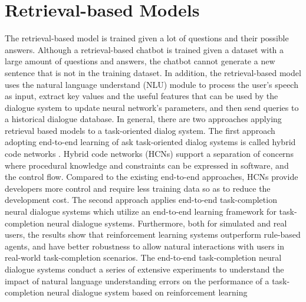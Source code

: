 \section{Retrieval-based Models}\label{subsubsec:Retrieval-based Models}
The retrieval-based model is trained given a lot of questions and their possible answers. Although a retrieval-based chatbot is trained given a dataset with a large amount of questions and answers, the chatbot cannot generate a new sentence that is not in the training dataset. In addition, the retrieval-based model \cite{Retrieval-based_Dialogue_System} uses the natural language understand (NLU) module to process the user’s speech as input, extract key values and the useful features that can be used by the dialogue system to update neural network’s parameters, and then send queries to a historical dialogue database. In general, there are two approaches applying retrieval based models to a task-oriented dialog system. The first approach adopting end-to-end learning of ask task-oriented dialog systems is called hybrid code networks \cite{HCN}. Hybrid code networks (HCNs) support a separation of concerns where procedural knowledge and constraints can be expressed in software, and the control flow. Compared to the existing end-to-end approaches, HCNs provide developers more control and require less training data so as to reduce the development cost. The second approach applies end-to-end task-completion neural dialogue systems \cite{End-to-End_Task-Completion_Neural_Dialogue_Systems} which utilize an end-to-end learning framework for task-completion neural dialogue systems. Furthermore, both for simulated and real users, the results show that reinforcement learning systems outperform rule-based agents, and have better robustness to allow natural interactions with users in real-world task-completion scenarios. The end-to-end task-completion neural dialogue systems conduct a series of extensive experiments to understand the impact of natural language understanding errors on the performance of a task-completion neural dialogue system based on reinforcement learning
